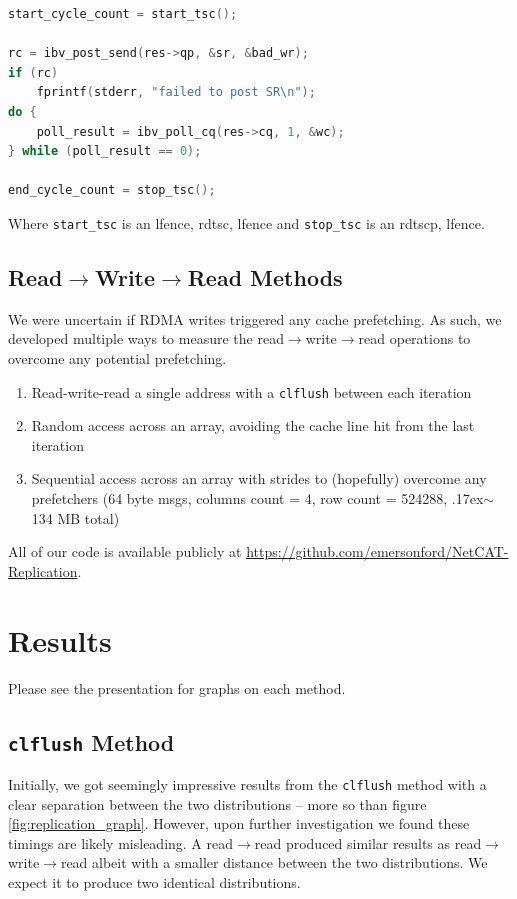 \documentclass[twocolumn]{article}
\begin{document}
\begin{lstlisting}[frame=single,language=C,basicstyle=\footnotesize]
start_cycle_count = start_tsc();

rc = ibv_post_send(res->qp, &sr, &bad_wr);
if (rc)
    fprintf(stderr, "failed to post SR\n");
do {
    poll_result = ibv_poll_cq(res->cq, 1, &wc);
} while (poll_result == 0);

end_cycle_count = stop_tsc();
\end{lstlisting}
Where \texttt{start\_tsc} is an lfence, rdtsc, lfence and \texttt{stop\_tsc} is an rdtscp, lfence.

\subsection{Read$\rightarrow$Write$\rightarrow$Read Methods}
We were uncertain if RDMA writes triggered any cache prefetching.
As such, we developed multiple ways to measure the read$\rightarrow$write$\rightarrow$read operations to overcome any potential prefetching.
\begin{enumerate}
 \item Read-write-read a single address with a \texttt{clflush} between each iteration
 \item Random access across an array, avoiding the cache line hit from the last iteration
 \item Sequential access across an array with strides to (hopefully) overcome any prefetchers (64 byte msgs, columns count = 4, row count = 524288, {\raise.17ex\hbox{$\scriptstyle\mathtt{\sim}$}}134 MB total)
\end{enumerate}

All of our code is available publicly at \url{https://github.com/emersonford/NetCAT-Replication}.

\section{Results}
Please see the presentation for graphs on each method.
\subsection{\texttt{clflush} Method}
Initially, we got seemingly impressive results from the \texttt{clflush} method with a clear separation between the two distributions -- more so than figure \ref{fig:replication_graph}.
However, upon further investigation we found these timings are likely misleading.
A read$\rightarrow$read produced similar results as read$\rightarrow$write$\rightarrow$read albeit with a smaller distance between the two distributions.
We expect it to produce two identical distributions.
\end{document}
